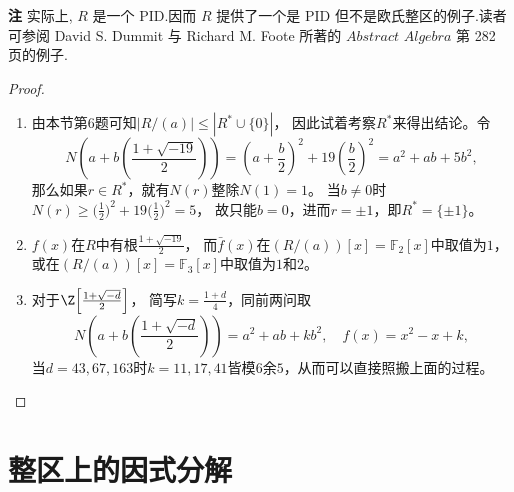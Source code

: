 \begin{enumerate}
\textbf{注} \quad 实际上, $ R $ 是一个 PID.因而 $ R $ 提供了一个是 PID 但不是欧氏整区的例子.读者可参阅 David S. Dummit 与 Richard M. Foote 所著的 $Abstract$ $Algebra$ 第 282 页的例子.
\begin{proof}
    \begin{enumerate}[label=(\arabic*)]
    \item 由本节第6题可知$|R/(a)|\leqslant|R^*\cup\{0\}|$，
    因此试着考察$R^*$来得出结论。令
    \[N\left(a+b\left(\frac{1+\sqrt{-19}}{2}\right)\right)
    =\left(a+\frac{b}{2}\right)^2+19\left(\frac{b}{2}\right)^2
    =a^2+ab+5b^2,\]
    那么如果$r \in R^*$，就有$N(r)$整除$N(1)=1$。
    当$b\ne0$时$N(r)\geqslant\big(\frac{1}{2}\big)^2+19\big(\frac{1}{2}\big)^2=5$，
    故只能$b=0$，进而$r=\pm1$，即$R^*=\{\pm1\}$。
    \item $f(x)$在$R$中有根$\frac{1+\sqrt{-19}}{2}$，
    而$\bar{f}(x)$在$(R/(a))[x]=\mathbb{F}_2[x]$中取值为$1$，
    或在$(R/(a))[x]=\mathbb{F}_3[x]$中取值为$1$和$2$。
    \item 对于$\Z\Big[\frac{1+\sqrt{-d}}{2}\Big]$，
    简写$k=\frac{1+d}{4}$，同前两问取
    \[N\left(a+b\left(\frac{1+\sqrt{-d}}{2}\right)\right)
    =a^2+ab+kb^2, \quad f(x)=x^2-x+k,\]
    当$d=43,67,163$时$k=11,17,41$皆模$6$余$5$，从而可以直接照搬上面的过程。\qedhere
    \end{enumerate}
\end{proof}
\end{enumerate}

\section{整区上的因式分解}

